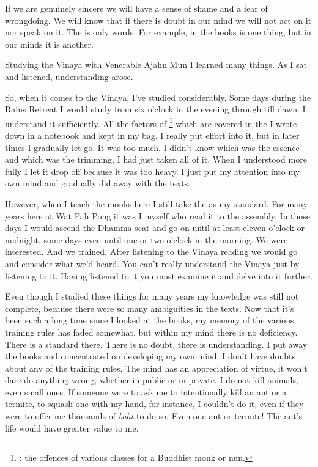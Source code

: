 If we are genuinely sincere we will have a sense of shame and a fear of wrongdoing. We will know that if there is doubt in our mind we will not act on it nor speak on it. The  is only words. For example,  in the books is one thing, but in our minds it is another. 

Studying the Vinaya with Venerable Ajahn Mun I learned many things. As I sat and listened, understanding arose. 

So, when it comes to the Vinaya, I've studied considerably. Some days during the Rains Retreat I would study from six o'clock in the evening through till dawn. I understand it sufficiently. All the factors of \footnote{: the offences of various classes for a Buddhist monk or nun.} which are covered in the  I wrote down in a notebook and kept in my bag. I really put effort into it, but in later times I gradually let go. It was too much. I didn't know which was the essence and which was the trimming, I had just taken all of it. When I understood more fully I let it drop off because it was too heavy. I just put my attention into my own mind and gradually did away with the texts. 

However, when I teach the monks here I still take the  as my standard. For many years here at Wat Pah Pong it was I myself who read it to the assembly. In those days I would ascend the Dhamma-seat and go on until at least eleven o'clock or midnight, some days even until one or two o'clock in the morning. We were interested. And we trained. After listening to the Vinaya reading we would go and consider what we'd heard. You can't really understand the Vinaya just by listening to it. Having listened to it you must examine it and delve into it further. 
 
Even though I studied these things for many years my knowledge was still not complete, because there were so many ambiguities in the texts. Now that it's been such a long time since I looked at the books, my memory of the various training rules has faded somewhat, but within my mind there is no deficiency. There is a standard there. There is no doubt, there is understanding. I put away the books and concentrated on developing my own mind. I don't have doubts about any of the training rules. The mind has an appreciation of virtue, it won't dare do anything wrong, whether in public or in private. I do not kill animals, even small ones. If someone were to ask me to intentionally kill an ant or a termite, to squash one with my hand, for instance, I couldn't do it, even if they were to offer me thousands of \textit{baht} to do so. Even one ant or termite! The ant's life would have greater value to me. 


